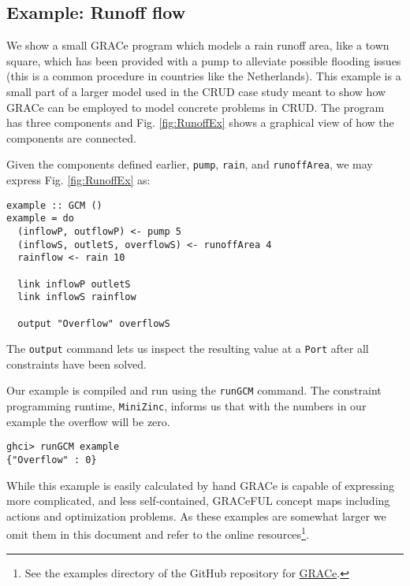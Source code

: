 \subsection{Example: Runoff flow}
\label{example-runoff-flow}

We show a small GRACe program which models a rain runoff area, like a
town square, which has been provided with a pump to alleviate possible
flooding issues (this is a common procedure in countries like the
Netherlands).
%
This example is a small part of a larger model used in the CRUD case
study meant to show how GRACe can be employed to model concrete problems
in CRUD.
%
The program has three components and Fig. \ref{fig:RunoffEx} shows a
graphical view of how the components are connected.
%

Given the components defined earlier, \texttt{pump}, \texttt{rain}, and \texttt{runoffArea},
we may express Fig. \ref{fig:RunoffEx} as:
\begin{verbatim}
example :: GCM ()
example = do
  (inflowP, outflowP) <- pump 5
  (inflowS, outletS, overflowS) <- runoffArea 4
  rainflow <- rain 10

  link inflowP outletS
  link inflowS rainflow

  output "Overflow" overflowS
\end{verbatim}
The \texttt{output} command lets us inspect the resulting value at a \texttt{Port}
after all constraints have been solved.

Our example is compiled and run using the \texttt{runGCM} command.
%
The constraint programming runtime, \texttt{MiniZinc}, informs us
that with the numbers in our example the overflow will be zero.

\begin{verbatim}
ghci> runGCM example
{"Overflow" : 0}
\end{verbatim}

While this example is easily calculated by hand GRACe is capable of
expressing more complicated, and less self-contained, GRACeFUL concept
maps including actions and optimization problems.
%
As these examples are somewhat larger we omit them in this document
and refer to the online resources\footnote{See the examples directory
  of the GitHub repository for
  \href{https://github.com/GRACeFUL-project/GRACe}{GRACe}.}.

